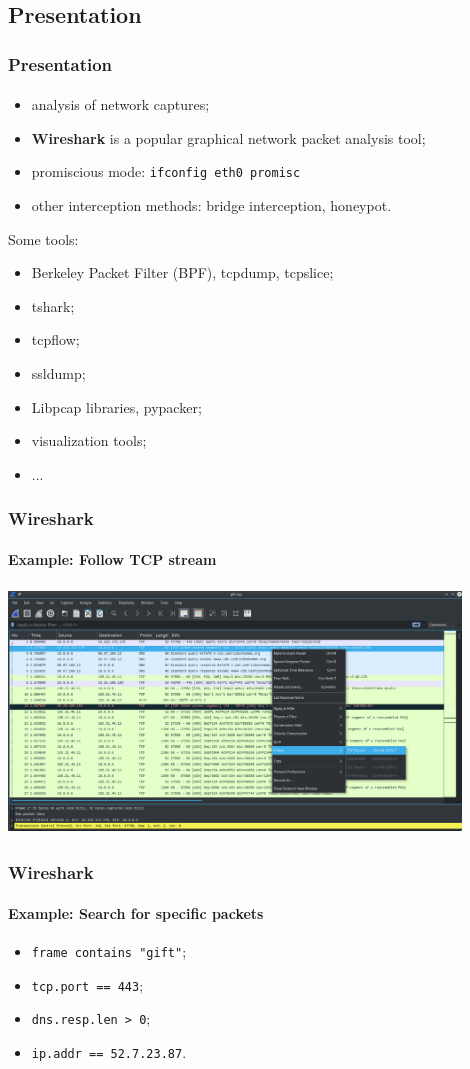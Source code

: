 \documentclass[]{beamer}
\begin{document}
\subsection{Presentation}
\begin{frame}
\frametitle{Presentation}
\framesubtitle{}
\begin{itemize}
    \item analysis of network captures;
    \item \textbf{Wireshark} is a popular graphical network packet analysis tool;
    \item promiscious mode: \texttt{ifconfig eth0 promisc}
    \item other interception methods: bridge interception, honeypot.
\end{itemize}
Some tools:
\begin{itemize}
    \item Berkeley Packet Filter (BPF), tcpdump,  tcpslice;
    \item tshark;
    \item tcpflow;
    \item ssldump;
    \item Libpcap libraries, pypacker;
    \item visualization tools;
    \item ...
\end{itemize}
\end{frame}




\begin{frame}
\frametitle{Wireshark}
\framesubtitle{Example: Follow TCP stream}
\begin{center}
    \includegraphics[height=6.5cm, width=12.0cm]{./images/Wireshark_follow_tcp_stream.png}
\end{center}
\end{frame}

\begin{frame}
\frametitle{Wireshark}
\framesubtitle{Example: Search for specific packets}
\begin{itemize}
    \item \texttt{frame contains "gift"};
    \item \texttt{tcp.port == 443};
    \item \texttt{dns.resp.len > 0};
    \item \texttt{ip.addr == 52.7.23.87}.
\end{itemize}
\end{frame}
\end{document}
